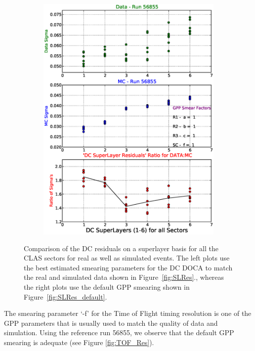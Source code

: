\begin{figure}[htpb]
\begin{center}
\begin{subfigure}{0.47\columnwidth}
    \includegraphics[width=\columnwidth]{figures/calib/dc/DC_Sigma_SL_default.eps}
    \label{fig:DC_SL_default}
\end{subfigure}
\caption[DC superlayers Resolution Matching]{\label{fig:DC_SL_Match}Comparison of the DC residuals on a superlayer basis for all the CLAS sectors for real as well as simulated events. The left plots use the best estimated smearing parameters for the DC DOCA to match the real and simulated data shown in Figure~\ref{fig:SLRes}., whereas the right plots use the default GPP smearing shown in Figure~\ref{fig:SLRes_default}.}
\end{center}\end{figure}

The smearing parameter `-f' for the Time of Flight timing resolution is one of the GPP parameters that is usually used to match the quality of data and simulation. Using the reference run 56855, we observe that the default GPP smearing is adequate (see Figure \ref{fig:TOF_Res}).

